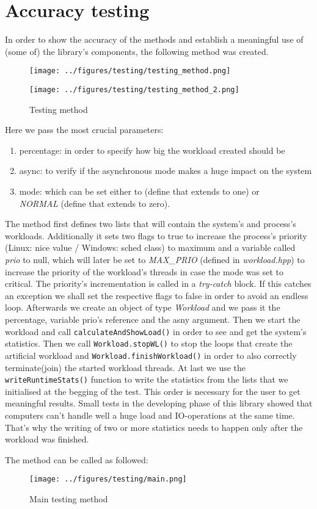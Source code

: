 \chapter{Accuracy testing}
In order to show the accuracy of the methods and establish a meaningful use of (some of) the library's components, the following method was created.
\begin{figure}[h]
	\centering
	\begin{minipage}[b]{0.5\textwidth}
		\texttt{[image: ../figures/testing/testing\_method.png]}
	\end{minipage}
	\begin{minipage}[b]{0.5\textwidth}
		\texttt{[image: ../figures/testing/testing\_method\_2.png]}
		\caption{Testing method}
	\end{minipage}
\end{figure}
Here we pass the most crucial parameters:
\begin{enumerate}
	\item percentage: in order to specify how big the workload created should be 
	\item async: to verify if the asynchronous mode makes a huge impact on the system
	\item mode: which can be set either to  (define that extends to one) or\\\textit{NORMAL} (define that extends to zero).
\end{enumerate}
The method first defines two lists that will contain the system's and process's workloads. Additionally it sets two flags to true to increase the process's priority (Linux: nice value / Windows: sched class) to maximum and a variable called \textit{prio} to null, which will later be set to \textit{MAX\_PRIO} (defined in \textit{workload.hpp}) to increase the priority of the workload's threads in case the mode was set to critical. The priority's incrementation is called in a \textit{try-catch} block. If this catches an exception we shall set the respective flags to false in order to avoid an endless loop.
Afterwards we create an object of type \textit{Workload} and we pass it the percentage, variable prio's reference and the asny argument. Then we start the workload and call \texttt{calculateAndShowLoad()} in order to see and get the system's statistics. Then we call \texttt{Workload.stopWL()} to stop the loops that create the artificial workload and \texttt{Workload.finishWorkload()} in order to also correctly terminate(join) the started workload threads. At last we use the \texttt{writeRuntimeStats()} function to write the statistics from the lists that we initialised at the begging of the test. This order is necessary for the user to get meaningful results. Small tests in the developing phase of this library showed that computers can't handle well a huge load and IO-operations at the same time. That's why the writing of two or more statistics needs to happen only after the workload was finished. 
 
The method can be called as followed:
\begin{figure}[!htbp]
	\texttt{[image: ../figures/testing/main.png]}
	\caption{Main testing method}
\end{figure}